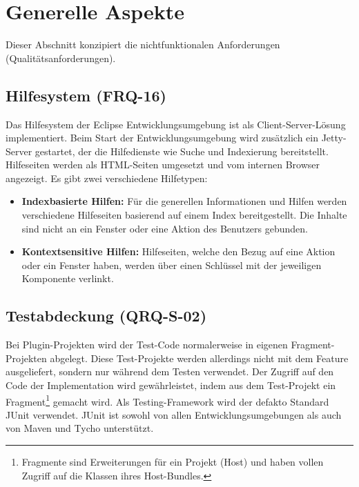 \chapter{Generelle Aspekte}
Dieser Abschnitt konzipiert die nichtfunktionalen Anforderungen (Qualitätsanforderungen).

\section{Hilfesystem (FRQ-16)}\label{hilfesystem}
Das Hilfesystem der Eclipse Entwicklungsumgebung ist als Client-Server-Lösung implementiert. Beim Start der Entwicklungsumgebung wird zusätzlich ein Jetty-Server gestartet, der die Hilfedienste wie Suche und Indexierung bereitstellt.  Hilfeseiten werden als HTML-Seiten umgesetzt und vom internen Browser angezeigt. Es gibt zwei verschiedene Hilfetypen:


\begin{itemize}
\item \textbf{Indexbasierte Hilfen:} Für die generellen Informationen und Hilfen werden verschiedene Hilfeseiten basierend auf einem Index bereitgestellt. Die Inhalte sind nicht an ein Fenster oder eine Aktion des Benutzers gebunden. 
\item \textbf{Kontextsensitive Hilfen:} Hilfeseiten, welche den Bezug auf eine Aktion oder ein Fenster haben, werden über einen Schlüssel mit der jeweiligen Komponente verlinkt.
\end{itemize}

\section{Testabdeckung (QRQ-S-02)}\label{testing}
Bei Plugin-Projekten wird der Test-Code normalerweise in eigenen Fragment-Projekten abgelegt. Diese Test-Projekte werden allerdings nicht mit dem Feature ausgeliefert, sondern nur während dem Testen verwendet. Der Zugriff auf den Code der Implementation wird gewährleistet, indem aus dem Test-Projekt ein Fragment\footnote{Fragmente sind Erweiterungen für ein Projekt (Host) und haben vollen Zugriff auf die Klassen ihres Host-Bundles.} gemacht wird. Als Testing-Framework wird der defakto Standard JUnit verwendet. JUnit ist sowohl von allen Entwicklungsumgebungen als auch von Maven und Tycho unterstützt.

